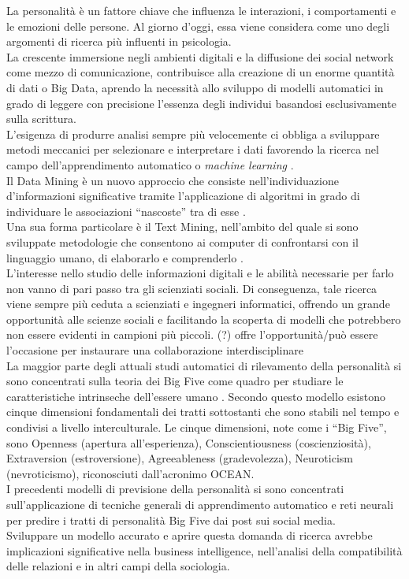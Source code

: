 La personalità è un fattore chiave che influenza le interazioni, i comportamenti e le emozioni delle persone. Al giorno d'oggi, essa viene considera come uno degli argomenti di ricerca più influenti in psicologia.
\\
La crescente immersione negli ambienti digitali e la diffusione dei social network come mezzo di comunicazione, contribuisce alla creazione di un enorme quantità di dati o Big Data, aprendo la necessità allo sviluppo di modelli automatici in grado di leggere con precisione l'essenza degli individui basandosi esclusivamente sulla scrittura.
\\
L'esigenza di produrre analisi sempre più velocemente ci obbliga a sviluppare metodi meccanici per selezionare e interpretare i dati favorendo la ricerca nel campo dell'apprendimento automatico o \emph{machine learning} \cite{samuel1959some}.
\\
Il Data Mining è un nuovo approccio che consiste nell'individuazione d’informazioni significative tramite l'applicazione di algoritmi in grado di individuare le associazioni ``nascoste'' tra di esse  \cite{chakrabarti2006data,franklin2005elements}. 
\\
Una sua forma particolare è il Text Mining, nell'ambito del quale si sono sviluppate metodologie che consentono ai computer di confrontarsi con il linguaggio umano, di elaborarlo e comprenderlo \cite{tan1999text}.
\\
{\color{blue}L'interesse nello studio delle informazioni digitali e le abilità necessarie per farlo non vanno di pari passo tra gli scienziati sociali. Di conseguenza, tale ricerca viene sempre più ceduta a scienziati e ingegneri informatici, offrendo un grande opportunità alle scienze sociali e facilitando la scoperta di modelli che potrebbero non essere evidenti in campioni più piccoli. (?) offre l'opportunità/può essere l'occasione per instaurare una collaborazione interdisciplinare}
\\
La maggior parte degli attuali studi automatici di rilevamento della personalità si sono concentrati sulla teoria dei Big Five come quadro per studiare le caratteristiche intrinseche dell'essere umano \cite{barrick1991big}.
Secondo questo modello esistono cinque dimensioni fondamentali dei tratti sottostanti che sono stabili nel tempo e condivisi a livello interculturale. Le cinque dimensioni, note come i ``Big Five'', sono Openness (apertura all'esperienza), Conscientiousness (coscienziosità), Extraversion (estroversione), Agreeableness (gradevolezza), Neuroticism (nevroticismo), riconosciuti dall'acronimo OCEAN.
\\
I precedenti modelli di previsione della personalità si sono concentrati sull'applicazione di tecniche generali di apprendimento automatico e reti neurali per predire i tratti di personalità Big Five dai post sui social media. 
\\
Sviluppare un modello accurato e aprire questa domanda di ricerca avrebbe implicazioni significative nella business intelligence, nell'analisi della compatibilità delle relazioni e in altri campi della sociologia.

